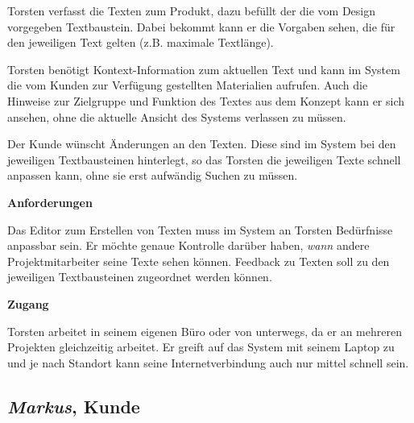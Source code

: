 \begin{multicols}{2}
Torsten verfasst die Texten zum Produkt, dazu befüllt der die vom Design vorgegeben Textbaustein. Dabei bekommt kann er die Vorgaben sehen, die für den jeweiligen Text gelten (z.B. maximale Textlänge). 

Torsten benötigt Kontext-Information zum aktuellen Text und kann im System die vom Kunden zur Verfügung gestellten Materialien aufrufen. Auch die Hinweise zur Zielgruppe und Funktion des Textes aus dem Konzept kann er sich ansehen, ohne die aktuelle Ansicht des Systems verlassen zu müssen.

Der Kunde wünscht Änderungen an den Texten. Diese sind im System bei den jeweiligen Textbausteinen hinterlegt, so das Torsten die jeweiligen Texte schnell anpassen kann, ohne sie erst aufwändig Suchen zu müssen.

\textbf{Anforderungen}

Das Editor zum Erstellen von Texten muss im System an Torsten Bedürfnisse anpassbar sein. Er möchte genaue Kontrolle darüber haben, \emph{wann} andere Projektmitarbeiter seine Texte sehen können. Feedback zu Texten soll zu den jeweiligen Textbausteinen zugeordnet werden können.

\textbf{Zugang}

Torsten arbeitet in seinem eigenen Büro oder von unterwegs, da er an mehreren Projekten gleichzeitig arbeitet. Er greift auf das System mit seinem Laptop zu und je nach Standort kann seine Internetverbindung auch nur mittel schnell sein.

\end{multicols}

\pagebreak

\subsection{\emph{Markus}, Kunde}\label{p:markus}

